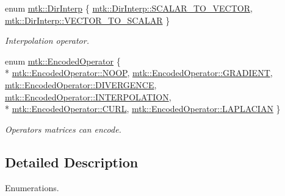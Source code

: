 \begin{DoxyCompactItemize}
enum \hyperlink{group__c02-enums_ga674ec67bd1baa04e5dc06c2bcc351972}{mtk\+::\+Dir\+Interp} \{ \hyperlink{group__c02-enums_ga674ec67bd1baa04e5dc06c2bcc351972a53facfbeb6725b2bd220c8d9811a0673}{mtk\+::\+Dir\+Interp\+::\+S\+C\+A\+L\+A\+R\+\_\+\+T\+O\+\_\+\+V\+E\+C\+T\+O\+R}, 
\hyperlink{group__c02-enums_ga674ec67bd1baa04e5dc06c2bcc351972a6b389c8391a900c481d8c96c6045f468}{mtk\+::\+Dir\+Interp\+::\+V\+E\+C\+T\+O\+R\+\_\+\+T\+O\+\_\+\+S\+C\+A\+L\+A\+R}
 \}
\begin{DoxyCompactList}\small\item\em Interpolation operator. \end{DoxyCompactList}\item 
enum \hyperlink{group__c02-enums_ga9b50023bfb2692219d2915feade94f80}{mtk\+::\+Encoded\+Operator} \{ \\*
\hyperlink{group__c02-enums_ga9b50023bfb2692219d2915feade94f80a722d122e81cbbe543bd5520bb8678c0e}{mtk\+::\+Encoded\+Operator\+::\+N\+O\+O\+P}, 
\hyperlink{group__c02-enums_ga9b50023bfb2692219d2915feade94f80a90f70ea2675c36bd9b0b44a79f37a41f}{mtk\+::\+Encoded\+Operator\+::\+G\+R\+A\+D\+I\+E\+N\+T}, 
\hyperlink{group__c02-enums_ga9b50023bfb2692219d2915feade94f80a4e4e9e6d004c642e33d6f823b57bd60e}{mtk\+::\+Encoded\+Operator\+::\+D\+I\+V\+E\+R\+G\+E\+N\+C\+E}, 
\hyperlink{group__c02-enums_ga9b50023bfb2692219d2915feade94f80a6a9b19b26cdeae14c1102cd40345d568}{mtk\+::\+Encoded\+Operator\+::\+I\+N\+T\+E\+R\+P\+O\+L\+A\+T\+I\+O\+N}, 
\\*
\hyperlink{group__c02-enums_ga9b50023bfb2692219d2915feade94f80aa8bc924d0898064a538c557848f7ab48}{mtk\+::\+Encoded\+Operator\+::\+C\+U\+R\+L}, 
\hyperlink{group__c02-enums_ga9b50023bfb2692219d2915feade94f80a1c2d5f3f8e6cbb0c7b033c388c905d22}{mtk\+::\+Encoded\+Operator\+::\+L\+A\+P\+L\+A\+C\+I\+A\+N}
 \}
\begin{DoxyCompactList}\small\item\em Operators matrices can encode. \end{DoxyCompactList}\end{DoxyCompactItemize}


\subsection{Detailed Description}
Enumerations. 

